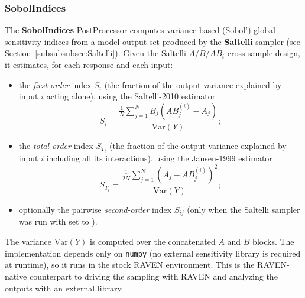 \subsubsection{SobolIndices}
\label{SobolIndices}
The \textbf{SobolIndices} PostProcessor computes variance-based (Sobol') global
sensitivity indices from a model output set produced by the \textbf{Saltelli}
sampler (see Section~\ref{subsubsubsec:Saltelli}). Given the Saltelli
$A / B / AB_i$ cross-sample design, it estimates, for each 
response and each  input:
\begin{itemize}
  \item the \emph{first-order} index $S_i$ (the fraction of the output variance
        explained by input $i$ acting alone), using the Saltelli-2010 estimator
        \[ S_i = \frac{\frac{1}{N}\sum_{j=1}^{N} B_j\left(AB^{(i)}_j - A_j\right)}
                       {\mathrm{Var}(Y)}; \]
  \item the \emph{total-order} index $S_{T_i}$ (the fraction of the output
        variance explained by input $i$ including all its interactions), using
        the Jansen-1999 estimator
        \[ S_{T_i} = \frac{\frac{1}{2N}\sum_{j=1}^{N}\left(A_j - AB^{(i)}_j\right)^2}
                          {\mathrm{Var}(Y)}; \]
  \item optionally the pairwise \emph{second-order} index $S_{ij}$ (only when the
        Saltelli sampler was run with  set to
        ).
\end{itemize}
The variance $\mathrm{Var}(Y)$ is computed over the concatenated $A$ and $B$
blocks. The implementation depends only on \texttt{numpy} (no external
sensitivity library is required at runtime), so it runs in the stock RAVEN
environment. This is the RAVEN-native counterpart to driving the sampling with
RAVEN and analyzing the outputs with an external library.
%
%

